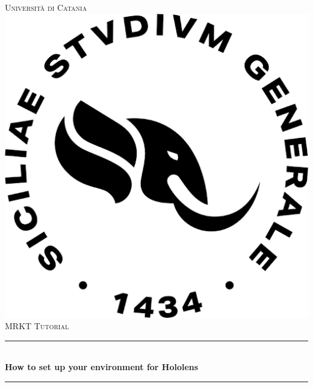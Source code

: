 \documentclass[12pt]{article}
\begin{document}
\begin{titlepage}

\newcommand{\HRule}{\rule{\linewidth}{0.5mm}} %

\center %
 

\textsc{\LARGE Università di Catania}\\[1.5cm] %
\includegraphics[scale=.3]{logoUnict.png}\\[1cm] %
\textsc{\Large MRKT Tutorial}\\[0.5cm] %


\HRule \\[0.4cm]
{ \huge \bfseries How to set up your environment for Hololens}\\[0.4cm] %
\HRule \\[1.5cm]
 

\end{titlepage}
\end{document}
